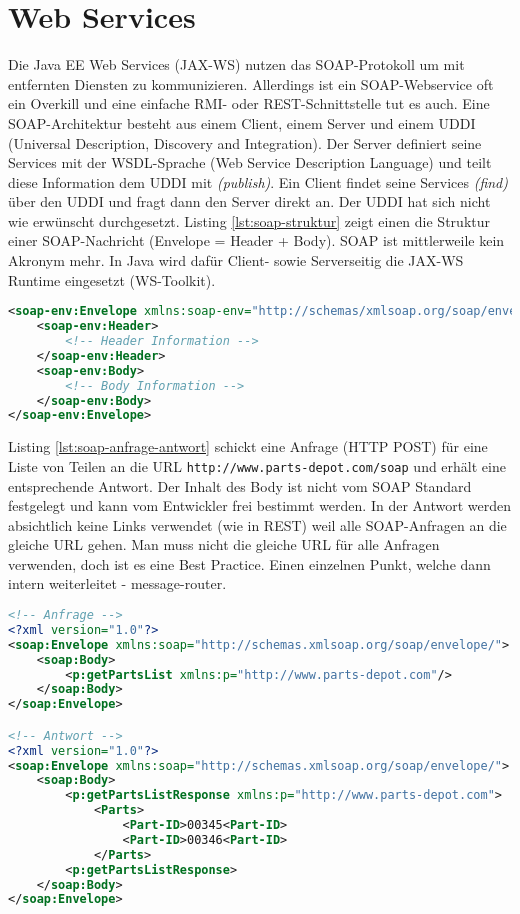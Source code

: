 \chapter{Web Services}

Die Java EE Web Services (JAX-WS) nutzen das SOAP-Protokoll um mit entfernten Diensten zu kommunizieren. Allerdings ist ein SOAP-Webservice oft ein Overkill und eine einfache RMI- oder REST-Schnittstelle tut es auch. Eine SOAP-Architektur besteht aus einem Client, einem Server und einem UDDI (Universal Description, Discovery and Integration). Der Server definiert seine Services mit der WSDL-Sprache (Web Service Description Language) und teilt diese Information dem UDDI mit \emph{(publish)}. Ein Client findet seine Services \emph{(find)} über den UDDI und fragt dann den Server direkt an. Der UDDI hat sich nicht wie erwünscht durchgesetzt. Listing \ref{lst:soap-struktur} zeigt einen die Struktur einer SOAP-Nachricht (Envelope = Header + Body). SOAP ist mittlerweile kein Akronym mehr. In Java wird dafür Client- sowie Serverseitig die JAX-WS Runtime eingesetzt (WS-Toolkit).

\begin{lstlisting}[language=XML, caption=SOAP Struktur, label=lst:soap-struktur]
<soap-env:Envelope xmlns:soap-env="http://schemas/xmlsoap.org/soap/envelope/">
	<soap-env:Header>
		<!-- Header Information -->
	</soap-env:Header>
	<soap-env:Body>
		<!-- Body Information -->
	</soap-env:Body>
</soap-env:Envelope>
\end{lstlisting}

Listing \ref{lst:soap-anfrage-antwort} schickt eine Anfrage (HTTP POST) für eine Liste von Teilen an die URL \verb|http://www.parts-depot.com/soap| und erhält eine entsprechende Antwort. Der Inhalt des Body ist nicht vom SOAP Standard festgelegt und kann vom Entwickler frei bestimmt werden. In der Antwort werden absichtlich keine Links verwendet (wie in REST) weil alle SOAP-Anfragen an die gleiche URL gehen. Man muss nicht die gleiche URL für alle Anfragen verwenden, doch ist es eine Best Practice. Einen einzelnen Punkt, welche dann intern weiterleitet - message-router.

\begin{lstlisting}[language=XML, caption=SOAP Anfrage/Antwort, label=lst:soap-anfrage-antwort]
<!-- Anfrage -->
<?xml version="1.0"?>
<soap:Envelope xmlns:soap="http://schemas.xmlsoap.org/soap/envelope/">
	<soap:Body>
		<p:getPartsList xmlns:p="http://www.parts-depot.com"/>
	</soap:Body>
</soap:Envelope>

<!-- Antwort -->
<?xml version="1.0"?>
<soap:Envelope xmlns:soap="http://schemas.xmlsoap.org/soap/envelope/">
	<soap:Body>
		<p:getPartsListResponse xmlns:p="http://www.parts-depot.com">
			<Parts>
				<Part-ID>00345<Part-ID>
				<Part-ID>00346<Part-ID>
			</Parts>
		<p:getPartsListResponse>
	</soap:Body>
</soap:Envelope>
\end{lstlisting}